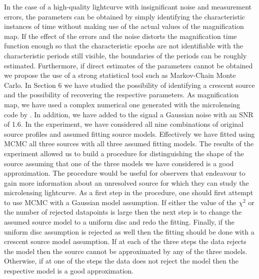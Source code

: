 In the case of a high-quality lightcurve with insignificant noise and measurement errors, the parameters can be obtained
by simply identifying the characteristic instances of time without making use of the actual values of the magnification
 map. If the effect of the errors and the noise distorts the magnification time function enough so that the
characteristic epochs are not identifiable with the characteristic periods still visible, the boundaries of the periods
can be roughly estimated. Furthermore, if direct estimates of the parameters cannot be obtained we propose the use of a strong
statistical tool such as Markov-Chain Monte Carlo. In Section 6  we have studied the possibility of identifying a crescent
source and  the possibility of recovering the respective parameters. As magnification map, we have used a complex numerical
one generated with the microlensing code by \cite{1999A&A...346L...5W}. In addition, we have added to the signal a Gaussian
noise with an SNR of 1.6.  In the experiment, we have considered all nine combinations of original source profiles and assumed fitting source models.
Effectively we have fitted using MCMC all three sources with all three assumed fitting models. The results of the experiment allowed us to build a
procedure for distinguishing the shape of the source assuming that one of the three models we have considered is a good approximation.
The procedure would be useful for observers that endeavour to gain more information about an unresolved source for which they can study
the microlensing lightcurve.  As a first step in the procedure, one should first attempt to use MCMC with a Gaussian model assumption.
If either the value of the $\chi^2$ or the number of rejected datapoints is large then the next step is to change the assumed source model to
a uniform disc and redo the fitting. Finally, if the uniform disc assumption is rejected as well then the fitting should be done with a
crescent source model assumption. If at each of the three steps the data rejects the model then the source cannot be approximated by any of the three models.
Otherwise, if at one of the steps the data does not reject the model then the respective model is a good approximation.
